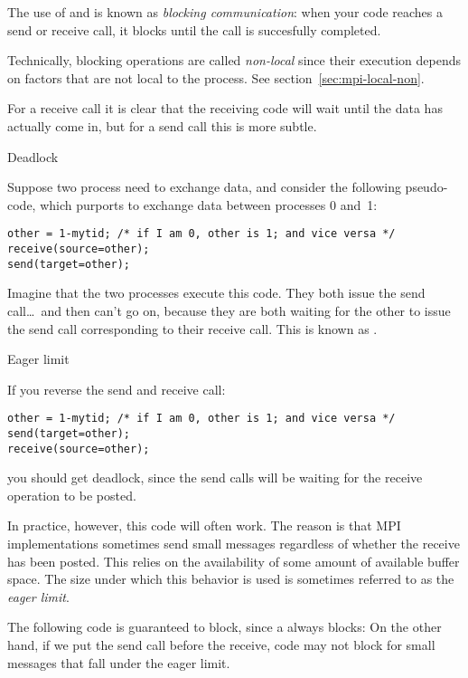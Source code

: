 The use of  and 
is known as \emph{blocking communication}: when your code reaches a
send or receive call, it blocks until the call is succesfully completed.

Technically, blocking operations are called
\emph{non-local} since their execution
depends on factors that are not local to the process.
See section~\ref{sec:mpi-local-non}.

For a receive call it is clear that the receiving code will wait until
the data has actually come in, but for a send call this is more subtle.

 {Deadlock}

Suppose two process need to exchange data, and consider the following
pseudo-code, which purports to exchange data between processes 0 and~1:
\begin{lstlisting}
other = 1-mytid; /* if I am 0, other is 1; and vice versa */
receive(source=other);
send(target=other);
\end{lstlisting}
Imagine that the two processes execute this code. They both issue the
send call\ldots\ and then can't go on, because they are both waiting
for the other to issue the send call corresponding to their receive call.
This is known as .

 {Eager limit}
\label{sec:eager-limit}

If you reverse the send and receive call:
\begin{lstlisting}
other = 1-mytid; /* if I am 0, other is 1; and vice versa */
send(target=other);
receive(source=other);
\end{lstlisting}
you should get deadlock,
since the send calls will be waiting for the receive operation to be posted.

In practice, however, this code will often work. The reason is that
MPI implementations sometimes send small messages regardless of whether
the receive has been posted. This relies on the availability of
some amount of available buffer space. The size under which this behavior
is used is sometimes referred to as the \emph{eager limit}.

The following code is guaranteed to block, since a 
always blocks:
On the other hand, if we put the send call before the receive,
code may not block for small messages
that fall under the eager limit.

